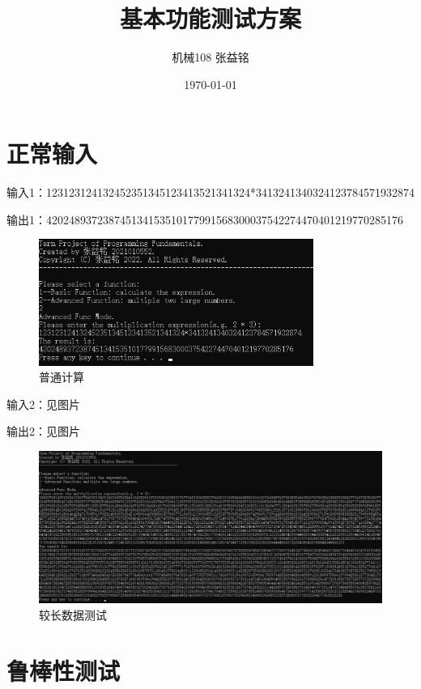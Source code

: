\documentclass[a4paper, 11pt, UTF8]{ctexart}
\title{基本功能测试方案}
\author{机械108 \qquad 张益铭 \qquad 2021010552}
\date{\today}
\begin{document}
\maketitle

\tableofcontents


\newpage

\section{正常输入}

输入1：123123124132452351345123413521341324*3413241340324123784571932874

输出1：420248937238745134153510177991568300037542274470401219770285176

\begin{figure}[H]
    \centering
    \caption{普通计算}
    \includegraphics[width=0.8\textwidth]{t2.png}    
\end{figure}

输入2：见图片

输出2：见图片

\begin{figure}[H]
    \centering
    \caption{较长数据测试}
    \includegraphics[width=\textwidth]{t1.png}    
\end{figure}

\newpage

\section{鲁棒性测试}
\end{document}
